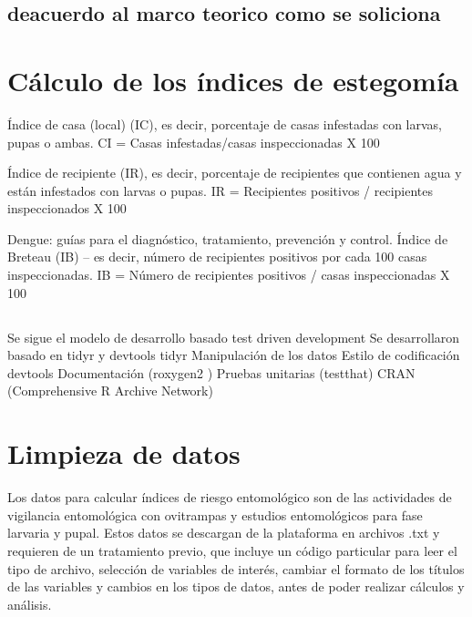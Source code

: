 \documentclass[
  letterpaper,
  twocolumn,
  landscape]{report}
\begin{document}
\section{deacuerdo al marco teorico como se
soliciona}\label{deacuerdo-al-marco-teorico-como-se-soliciona}

\section{}\label{section}


\chapter{Cálculo de los índices de
estegomía}\label{cuxe1lculo-de-los-uxedndices-de-estegomuxeda}

Índice de casa (local) (IC), es decir, porcentaje de casas infestadas
con larvas, pupas o ambas. CI = Casas infestadas/casas inspeccionadas X
100

Índice de recipiente (IR), es decir, porcentaje de recipientes que
contienen agua y están infestados con larvas o pupas. IR = Recipientes
positivos / recipientes inspeccionados X 100

Dengue: guías para el diagnóstico, tratamiento, prevención y control.
Índice de Breteau (IB) -- es decir, número de recipientes positivos por
cada 100 casas inspeccionadas. IB = Número de recipientes positivos /
casas inspeccionadas X 100

\section{}\label{section-1}

Se sigue el modelo de desarrollo basado test driven development Se
desarrollaron basado en tidyr y devtools tidyr Manipulación de los datos
Estilo de codificación devtools Documentación (roxygen2 ) Pruebas
unitarias (testthat) CRAN (Comprehensive R Archive Network)


\chapter{Limpieza de datos}\label{limpieza-de-datos}

Los datos para calcular índices de riesgo entomológico son de las
actividades de vigilancia entomológica con ovitrampas y estudios
entomológicos para fase larvaria y pupal. Estos datos se descargan de la
plataforma en archivos .txt y requieren de un tratamiento previo, que
incluye un código particular para leer el tipo de archivo, selección de
variables de interés, cambiar el formato de los títulos de las variables
y cambios en los tipos de datos, antes de poder realizar cálculos y
análisis.
\end{document}
